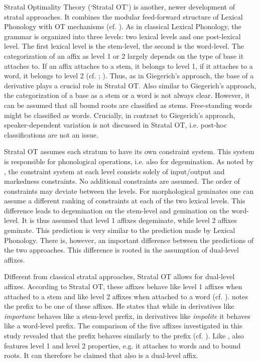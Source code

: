 Stratal Optimality Theory (`Stratal OT') is another, newer development of stratal approaches. It combines the modular feed-forward structure of Lexical Phonology with OT mechanisms (cf. \citealt{BermudezOtero.2012,BermudezOtero.2013,Kiparsky.2015,BermudezOtero.2017}). As in classical Lexical Phonology, the grammar is organized into three levels: two lexical levels and one post-lexical level. The first lexical level is the stem-level, the second is the word-level. The categorization of an affix as level 1 or 2 largely depends on the type of base it attaches to. If an affix attaches to a stem, it belongs to level 1, if it attaches to a word, it belongs to level 2 (cf. \citealt[7]{Kiparsky.2015}; \citealt[9 f.]{BermudezOtero.2017}).  Thus, as in Giegerich's approach, the base of a derivative plays a crucial role in Stratal OT. Also similar to Giegerich's approach, the categorization of a base as a stem or a word is not always clear. However, it can be assumed that all bound roots are classified as stems. Free-standing words might be classified as words. Crucially, in contrast to Giegerich's approach, speaker-dependent variation is not discussed in Stratal OT, i.e. post-hoc classifications are not an issue.

Stratal OT assumes each stratum to have its own constraint system. This system is responsible for phonological operations, i.e. also for degemination. As noted by \citet[5]{Kiparsky.2015}, the constraint system at each level consists solely of input/output and markedness constraints. No additional constraints are assumed. The order of constraints may deviate between the levels. For morphological geminates one can assume a different ranking of constraints at each of the two lexical levels. This difference leads to degemination on the stem-level and gemination on the word-level. It is thus assumed that level 1 affixes degeminate, while level 2 affixes geminate. This prediction is very similar to the prediction made by Lexical Phonology. There is, however, an important difference between the predictions of the two approaches. This difference is rooted in the assumption of dual-level affixes.

Different from classical stratal approaches, Stratal OT allows for dual-level affixes. According to Stratal OT, these affixes behave like level 1 affixes when attached to a stem and like level 2 affixes when attached to a word (cf. \citealt[15, 33]{BermudezOtero.2017}). 
\citet[33]{BermudezOtero.2017} notes the prefix  to be one of these affixes. He states that while in derivatives like \textit{importune}  behaves like a stem-level prefix, in derivatives like \textit{impolite} it behaves like a word-level prefix. The comparison of the five affixes investigated in this study revealed that the prefix  behaves similarly to the prefix  (cf. ). Like ,  also features level 1 and level 2 properties, e.g. it attaches to words and to bound roots. It can therefore be claimed that  also is a dual-level affix.  


